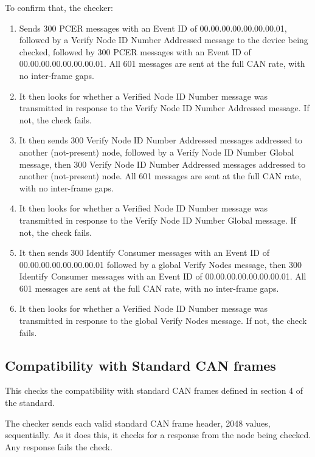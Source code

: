 To confirm that, the checker:

\begin{enumerate}
    \item Sends 300 PCER messages with an Event ID of 
        00.00.00.00.00.00.00.01, followed by a Verify Node ID Number Addressed 
        message to the device being checked,
        followed by 300 PCER messages with an Event ID of 
        00.00.00.00.00.00.00.01. 
        All 601 messages are sent at the full CAN rate, with no inter-frame gaps.
    \item It then looks for whether a Verified Node ID Number message was transmitted in
        response to the Verify Node ID Number Addressed message. If not, the check fails.
    \item It then sends 300 Verify Node ID Number Addressed messages addressed 
        to another (not-present) node,
        followed by a Verify Node ID Number Global message, 
        then 300 Verify Node ID Number Addressed messages
        addressed to another (not-present) node.
        All 601 messages are sent at the full CAN rate, with no inter-frame gaps.
    \item It then looks for whether a Verified Node ID Number message was transmitted in
        response to the Verify Node ID Number Global message. If not, the check fails.
    \item It then sends 300 Identify Consumer messages with an Event ID of 
        00.00.00.00.00.00.00.01
        followed by a global Verify Nodes message, then 
        300 Identify Consumer messages with an Event ID of 
        00.00.00.00.00.00.00.01.
        All 601 messages are sent at the full CAN rate, with no inter-frame gaps.
    \item It then looks for whether a Verified Node ID Number message was transmitted in
        response to the global Verify Nodes message. If not, the check fails.
\end{enumerate}

\subsection{Compatibility with Standard CAN frames}

This checks the compatibility with standard CAN frames defined in section 4 of the standard.

The checker sends each valid standard CAN frame header, 2048 values, sequentially.
As it does this, it checks for a response from the node being checked.  Any response 
fails the check.

  
